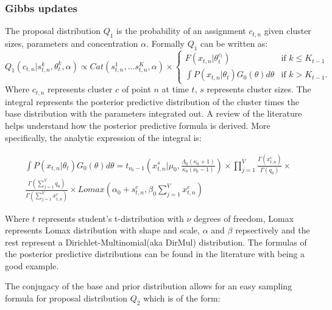 \documentclass[]{article}
\begin{document}
\subsubsection{Gibbs updates}
The proposal distribution $Q_1$ is the probability of an assignment $c_{t,n}$ given cluster sizes, parameters and concentration $\alpha$. Formally $Q_1$ can be written as:
\begin{equation} \label{Gibbs}
    Q_1(c_{t,n} | s_{t,n}^k, \theta_t^k, \alpha) \propto Cat( s_{t,n}^1,...s_{t,n}^K, \alpha ) \times
    \begin{cases} 
        F(x_{t,n} | \theta_t^{c_t} )  &\mbox{if } k \leq K_{t-1} \\
    \int P(x_{t,n} | \theta_t )G_0(\theta) d\theta & \mbox{if } k > K_{t-1}. \end{cases}
    \end{equation}
    Where $c_{t,n}$ represents cluster $c$ of point $n$ at time $t$, $s$ represents cluster sizes. The integral represents the posterior predictive distribution of the cluster times the base distribution with the parameters integrated out. A review of the literature helps understand how the posterior predictive formula is derived. More specifically, the analytic expression of the integral is:


    \begin{equation} \label{Q1}
        \begin{split}
            \int P(x_{t,n} | \theta_t )G_0(\theta) d\theta
            = t_{\nu_0-1}( x_{t,n}^s | \mu_0, \frac{\Lambda_0(\kappa_0+1)}{\kappa_0(\nu_0-1)}) \times \prod_{j=1}^V \frac{\Gamma(x_{t,n}^c)}{\Gamma(q_0)} \times \\ \frac{\Gamma(\sum_{j=1}^V q_0)}{\Gamma(\sum_{j=1}^V x_{t,n}^c)} \times Lomax(\alpha_0 + s_{t,n}^c, \beta_0 \sum_{j=1}^V x_{t,n}^c)
        \end{split}
    \end{equation}

    Where $t$ represents student's t-distribution with $\nu$ degrees of freedom, Lomax represents Lomax distribution with shape and scale, $\alpha$ and $\beta$ repsectively and the rest represent a Dirichlet-Multinomial(aka DirMul) distribution. The formulas of the posterior predictive distributions can be found in the literature with \cite{compendium} being a good example. 

    The conjugacy of the base and prior distribution allows for an easy sampling formula for proposal distribution $Q_2$ which is of the form: 
\end{document}
